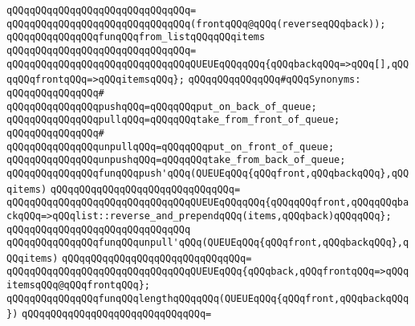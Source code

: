 \verb|qQQqqQQqqQQqqQQqqQQqqQQqqQQqqQQq=|\newline
\verb|qQQqqQQqqQQqqQQqqQQqqQQqqQQqqQQq(frontqQQq@qQQq(reverseqQQqback));|\newline
\newline
\verb|qQQqqQQqqQQqqQQqfunqQQqfrom_listqQQqqQQqitems|\newline
\verb|qQQqqQQqqQQqqQQqqQQqqQQqqQQqqQQq=|\newline
\verb|qQQqqQQqqQQqqQQqqQQqqQQqqQQqqQQqQUEUEqQQqqQQq{qQQqbackqQQq=>qQQq[],qQQqqQQqfrontqQQq=>qQQqitemsqQQq};|\newline
\newline
\newline
\verb|qQQqqQQqqQQqqQQq#qQQqSynonyms:|\newline
\verb|qQQqqQQqqQQqqQQq#|\newline
\verb|qQQqqQQqqQQqqQQqpushqQQq=qQQqqQQqput_on_back_of_queue;|\newline
\verb|qQQqqQQqqQQqqQQqpullqQQq=qQQqqQQqtake_from_front_of_queue;|\newline
\verb|qQQqqQQqqQQqqQQq#|\newline
\verb|qQQqqQQqqQQqqQQqunpullqQQq=qQQqqQQqput_on_front_of_queue;|\newline
\verb|qQQqqQQqqQQqqQQqunpushqQQq=qQQqqQQqtake_from_back_of_queue;|\newline
\newline
\newline
\verb|qQQqqQQqqQQqqQQqfunqQQqpush'qQQq(QUEUEqQQq{qQQqfront,qQQqbackqQQq},qQQqitems)|\newline
\verb|qQQqqQQqqQQqqQQqqQQqqQQqqQQqqQQq=|\newline
\verb|qQQqqQQqqQQqqQQqqQQqqQQqqQQqqQQqQUEUEqQQqqQQq{qQQqqQQqfront,qQQqqQQqbackqQQq=>qQQqlist::reverse_and_prependqQQq(items,qQQqback)qQQqqQQq};|\newline
\verb|qQQqqQQqqQQqqQQqqQQqqQQqqQQqqQQq|\newline
\newline
\verb|qQQqqQQqqQQqqQQqfunqQQqunpull'qQQq(QUEUEqQQq{qQQqfront,qQQqbackqQQq},qQQqitems)|\newline
\verb|qQQqqQQqqQQqqQQqqQQqqQQqqQQqqQQq=|\newline
\verb|qQQqqQQqqQQqqQQqqQQqqQQqqQQqqQQqQUEUEqQQq{qQQqback,qQQqfrontqQQq=>qQQqitemsqQQq@qQQqfrontqQQq};|\newline
\newline
\verb|qQQqqQQqqQQqqQQqfunqQQqlengthqQQqqQQq(QUEUEqQQq{qQQqfront,qQQqbackqQQq})|\newline
\verb|qQQqqQQqqQQqqQQqqQQqqQQqqQQqqQQq=|\newline
